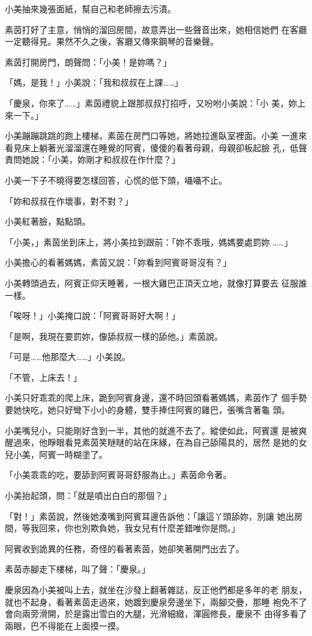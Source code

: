 小美抽來幾張面紙，幫自己和老師擦去污漬。

素茵打好了主意，悄悄的溜回房間，故意弄出一些聲音出來，她相信她們
在客廳一定聽得見。果然不久之後，客廳又傳來鋼琴的音樂聲。

素茵打開房門，朗聲問：「小美！是妳嗎？」

「媽，是我！」小美說：「我和叔叔在上課……」

「慶泉，你來了……」素茵禮貌上跟那叔叔打招呼，又吩咐小美說：「小
美，妳上來一下。」

小美蹦蹦跳跳的跑上樓梯，素茵在房門口等她，將她拉進臥室裡面。小美
一進來看見床上躺著光溜溜還在睡覺的阿賓，傻傻的看著母親，母親卻板起臉
孔，低聲責問她說：「小美，妳剛才和叔叔在作什麼？」

小美一下子不曉得要怎樣回答，心慌的低下頭，囁囁不止。

「妳和叔叔在作壞事，對不對？」

小美紅著臉，點點頭。

「小美，」素茵坐到床上，將小美拉到跟前：「妳不乖哦，媽媽要處罰妳
……」

小美擔心的看著媽媽，素茵又說：「妳看到阿賓哥哥沒有？」

小美轉頭過去，阿賓正仰天睡著，一根大雞巴正頂天立地，就像打算要去
征服誰一樣。

「唉呀！」小美掩口說：「阿賓哥哥好大啊！」

「是啊，我現在要罰妳，像舔叔叔一樣的舔他。」素茵說。

「可是……他那麼大……」小美說。

「不管，上床去！」

小美只好乖乖的爬上床，跪到阿賓身邊，還不時回頭看著媽媽，素茵作了
個手勢要她快吃，她只好彎下小小的身體，雙手捧住阿賓的雞巴，張嘴含著龜
頭。

小美嘴兒小，只能剛好含到一半，其他的就進不去了。縱使如此，阿賓還
是被爽醒過來，他睜眼看見素茵笑瞇瞇的站在床緣，在為自己舔陽具的，居然
是她的女兒小美，阿賓一時糊塗了。

「小美乖乖的吃，要舔到阿賓哥哥舒服為止。」素茵命令著。

小美抬起頭，問：「就是噴出白白的那個？」

「對！」素茵說，然後她湊嘴到阿賓耳邊告訴他：「讓這丫頭舔妳，別讓
她出房間，等我回來，你也別欺負她，我女兒有什麼差錯唯你是問。」

阿賓收到詭異的任務，奇怪的看著素茵，她卻笑著開門出去了。

素茵赤腳走下樓梯，叫了聲：「慶泉。」

慶泉因為小美被叫上去，就坐在沙發上翻著雜誌，反正他們都是多年的老
朋友，就也不起身，看著素茵走過來，她踱到慶泉旁邊坐下，兩腳交疊，那睡
袍免不了會向兩旁滑開，於是露出雪白的大腿，光滑細緻，渾圓修長，慶泉不
由得多看了兩眼，巴不得能在上面摸一摸。

